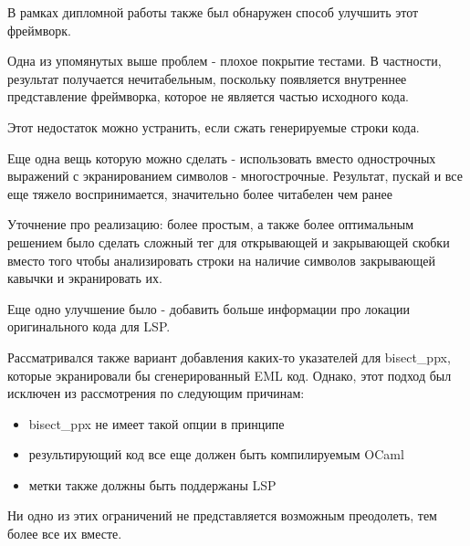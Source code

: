 В рамках дипломной работы также был обнаружен способ улучшить этот фреймворк.

Одна из упомянутых выше проблем - плохое покрытие тестами.
В частности, результат получается нечитабельным, поскольку появляется внутреннее представление фреймворка, которое не является частью исходного кода.


Этот недостаток можно устранить, если сжать генерируемые строки кода. 

Еще одна вещь которую можно сделать - использовать вместо однострочных выражений с экранированием символов - многострочные. Результат, пускай и все еще тяжело воспринимается, значительно более читабелен чем ранее


Уточнение про реализацию:
более простым, а также более оптимальным решением было сделать сложный тег для открывающей и закрывающей скобки вместо того чтобы анализировать строки на наличие символов закрывающей кавычки и экранировать их.

Еще одно улучшение было - добавить больше информации про локации оригинального кода для LSP.

Рассматривался также вариант добавления каких-то указателей для bisect\_ppx, которые экранировали бы сгенерированный EML код.
Однако, этот подход был исключен из рассмотрения по следующим причинам:
\begin{itemize}
    \item bisect\_ppx не имеет такой опции в принципе
    \item результирующий код все еще должен быть компилируемым OCaml
    \item метки также должны быть поддержаны LSP
\end{itemize}

Ни одно из этих ограничений не представляется возможным преодолеть, тем более все их вместе.
